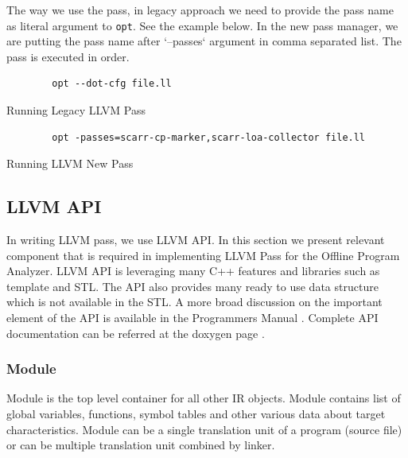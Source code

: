 The way we use the pass, in legacy approach we need to provide the pass name as literal argument to \texttt{opt}. See the example below. In the new pass manager, we are putting the pass name after `--passes` argument in comma separated list. The pass is executed in order.

\begin{listing}
    \begin{verbatim}
        opt --dot-cfg file.ll 
    \end{verbatim}
    \caption{Running Legacy LLVM Pass}    
    \label{listing:3-3}
\end{listing}

\begin{listing}
    \begin{verbatim}
        opt -passes=scarr-cp-marker,scarr-loa-collector file.ll 
    \end{verbatim}
\caption{Running LLVM New Pass}    
\label{listing:3-4}
\end{listing}

\subsection{LLVM API}

In writing LLVM pass, we use LLVM API. In this section we present relevant component that is required in implementing LLVM Pass for the Offline Program Analyzer. LLVM API is leveraging many C++ features and libraries such as template and STL. The API also provides many ready to use data structure which is not available in the STL. A more broad discussion on the important element of the API is available in the Programmers Manual \cite{LLVMProgrammerManuala}. Complete API documentation can be referred at the doxygen page \cite{LLVMLLVMa}.

\subsubsection{Module}

Module is the top level container for all other IR objects. Module contains list of global variables, functions, symbol tables and other various data about target characteristics. Module can be a single translation unit of a program (source file) or can be multiple translation unit combined by linker. 

